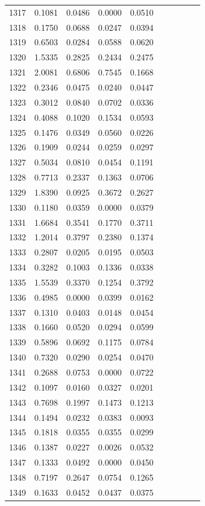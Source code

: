 \begin{table}
\begin{tabular}{cccccccccc}
1317& 0.1081& 0.0486& 0.0000& 0.0510\\ 
1318& 0.1750& 0.0688& 0.0247& 0.0394\\ 
1319& 0.6503& 0.0284& 0.0588& 0.0620\\ 
1320& 1.5335& 0.2825& 0.2434& 0.2475\\ 
1321& 2.0081& 0.6806& 0.7545& 0.1668\\ 
1322& 0.2346& 0.0475& 0.0240& 0.0447\\ 
1323& 0.3012& 0.0840& 0.0702& 0.0336\\ 
1324& 0.4088& 0.1020& 0.1534& 0.0593\\ 
1325& 0.1476& 0.0349& 0.0560& 0.0226\\ 
1326& 0.1909& 0.0244& 0.0259& 0.0297\\ 
1327& 0.5034& 0.0810& 0.0454& 0.1191\\ 
1328& 0.7713& 0.2337& 0.1363& 0.0706\\ 
1329& 1.8390& 0.0925& 0.3672& 0.2627\\ 
1330& 0.1180& 0.0359& 0.0000& 0.0379\\ 
1331& 1.6684& 0.3541& 0.1770& 0.3711\\ 
1332& 1.2014& 0.3797& 0.2380& 0.1374\\ 
1333& 0.2807& 0.0205& 0.0195& 0.0503\\ 
1334& 0.3282& 0.1003& 0.1336& 0.0338\\ 
1335& 1.5539& 0.3370& 0.1254& 0.3792\\ 
1336& 0.4985& 0.0000& 0.0399& 0.0162\\ 
1337& 0.1310& 0.0403& 0.0148& 0.0454\\ 
1338& 0.1660& 0.0520& 0.0294& 0.0599\\ 
1339& 0.5896& 0.0692& 0.1175& 0.0784\\ 
1340& 0.7320& 0.0290& 0.0254& 0.0470\\ 
1341& 0.2688& 0.0753& 0.0000& 0.0722\\ 
1342& 0.1097& 0.0160& 0.0327& 0.0201\\ 
1343& 0.7698& 0.1997& 0.1473& 0.1213\\ 
1344& 0.1494& 0.0232& 0.0383& 0.0093\\ 
1345& 0.1818& 0.0355& 0.0355& 0.0299\\ 
1346& 0.1387& 0.0227& 0.0026& 0.0532\\ 
1347& 0.1333& 0.0492& 0.0000& 0.0450\\ 
1348& 0.7197& 0.2647& 0.0754& 0.1265\\ 
1349& 0.1633& 0.0452& 0.0437& 0.0375\\ 

\end{tabular}
\end{table}
